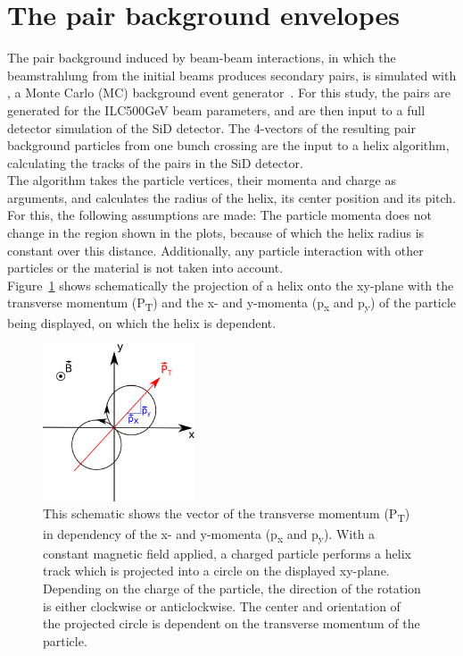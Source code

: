 \section{The pair background envelopes}
\label{Detector}
The pair background induced by beam-beam interactions, in which the beamstrahlung from the initial beams produces secondary \Pep \Pem pairs, is simulated with \guineapig, a Monte Carlo (MC) background event generator~\cite{Schulte:1997nga}.
For this study, the pairs are generated for the ILC500GeV beam parameters, and are then input to a \geant full detector simulation of the SiD detector.
The 4-vectors of the resulting pair background particles from one bunch crossing are the input to a helix algorithm, calculating the tracks of the pairs in the SiD detector.\\
The algorithm takes the particle vertices, their momenta and charge as arguments, and calculates the radius of the helix, its center position and its pitch.
For this, the following assumptions are made: 
The particle momenta does not change in the region shown in the plots, because of which the helix radius is constant over this distance.
Additionally, any particle interaction with other particles or the material is not taken into account.\\
Figure~\ref{fig:helix_circle} shows schematically the projection of a helix onto the xy-plane with the transverse momentum (P\textsubscript{T}) and the x- and y-momenta (p\textsubscript{x} and p\textsubscript{y}) of the particle being displayed, on which the helix is dependent.

\begin{figure}
    \centering
    \includegraphics[width=0.4\textwidth]{figures/Helix_explanation.png}
    \caption[Projection of the helix on the xy-plane]{
    This schematic shows the vector of the transverse momentum (P\textsubscript{T}) in dependency of the x- and y-momenta (p\textsubscript{x} and p\textsubscript{y}).
    With a constant magnetic field applied, a charged particle performs a helix track which is projected into a circle on the displayed xy-plane.
    Depending on the charge of the particle, the direction of the rotation is either clockwise or anticlockwise.
    The center and orientation of the projected circle is dependent on the transverse momentum of the particle.
    }
    \label{fig:helix_circle}
\end{figure}

